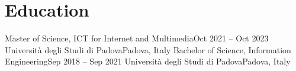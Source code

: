 \section{\textcolor{logocolor}{Education}}
\mySubHeadingListStart

  \mySubHeading
    {Master of Science, ICT for Internet and Multimedia}{Oct 2021 -- Oct 2023}
    { Università degli Studi di Padova}{Padova, Italy}
    \myItemListStart
    \myItemListEnd
  \mySubHeading
    {Bachelor of Science, Information Engineering}{Sep 2018 -- Sep 2021}
    { Università degli Studi di Padova}{Padova, Italy}
    \myItemListStart
    \myItemListEnd

\mySubHeadingListEnd
